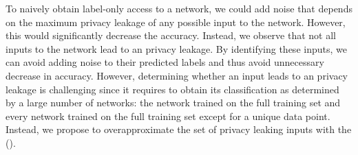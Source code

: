 \sloppy
To naively obtain \propi label-only access to a network, we could add
noise that depends on the maximum privacy leakage of any possible input to the network. %
However, this would significantly decrease the accuracy.
Instead, we observe that 
not all inputs to the network lead to an \propi privacy leakage. By identifying these inputs, we can avoid adding noise to their predicted labels and thus avoid unnecessary decrease in accuracy. However, determining whether an input leads to an \propi privacy leakage is challenging since it requires to obtain its classification as determined by a large number of networks: the network trained on the full training set and every network trained on the full training set except for a unique data point. Instead, we propose to overapproximate the set of privacy leaking inputs with the \emph{\propl} (\propa). 
